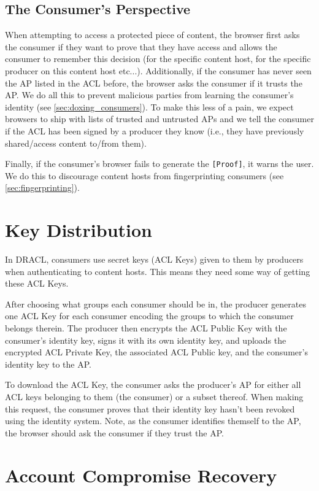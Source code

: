 \documentclass[pdftex,12pt,a4papaer,twoside,notitlepage]{report}
\begin{document}
\subsection{The Consumer's Perspective}
\label{sec:consumer_perspective}

When attempting to access a protected piece of content, the browser first asks
the consumer if they want to prove that they have access and allows the consumer
to remember this decision (for the specific content host, for the specific
producer on this content host etc...). Additionally, if the consumer has never
seen the AP listed in the ACL before, the browser asks the consumer if it trusts
the AP. We do all this to prevent malicious parties from learning the consumer's
identity (see \cref{sec:doxing_consumers}). To make this less of a pain, we
expect browsers to ship with lists of trusted and untrusted APs and we tell the
consumer if the ACL has been signed by a producer they know (i.e., they have
previously shared/access content to/from them).

Finally, if the consumer's browser fails to generate the \verb=[Proof]=, it
warns the user. We do this to discourage content hosts from fingerprinting
consumers (see \cref{sec:fingerprinting}).

\section{Key Distribution}

In DRACL, consumers use secret keys (ACL Keys) given to them by producers when
authenticating to content hosts. This means they need some way of getting these
ACL Keys.

After choosing what groups each consumer should be in, the producer generates
one ACL Key for each consumer encoding the groups to which the consumer belongs
therein. The producer then encrypts the ACL Public Key with the consumer's
identity key, signs it with its own identity key, and uploads the encrypted ACL
Private Key, the associated ACL Public key, and the consumer's identity key to
the AP.

To download the ACL Key, the consumer asks the producer's AP for either all ACL
keys belonging to them (the consumer) or a subset thereof. When making this
request, the consumer proves that their identity key hasn't been revoked using
the identity system. Note, as the consumer identifies themself to the AP, the
browser should ask the consumer if they trust the AP.

\section{Account Compromise Recovery}
\label{sec:revoke}
\end{document}

